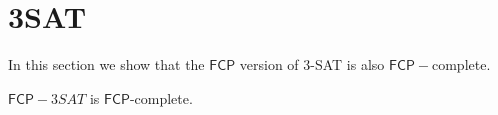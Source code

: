 \documentclass[runningheads,a4paper]{llncs}
\begin{document}
%
%
%

\section{3SAT}

In this section we show that the $\mathsf{FCP}$ version of 3-SAT is also $\mathsf{FCP}-$complete. 

\begin{theorem}
$\mathsf{FCP}-3SAT$ is $\mathsf{FCP}$-complete. 
\end{theorem} 
\end{document}
